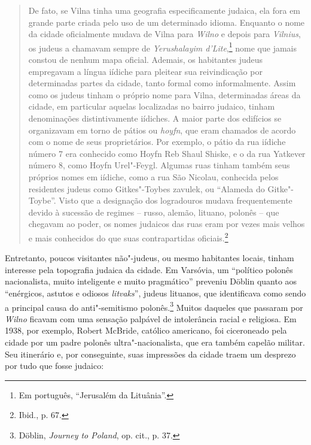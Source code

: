 \begin{quote}
De fato, se Vilna tinha uma geografia especificamente judaica, ela fora
em grande parte criada pelo uso de um determinado idioma. Enquanto o
nome da cidade oficialmente mudava de Vilna para \textit{Wilno} e depois para
\textit{Vilnius}, os judeus a chamavam 
sempre de \textit{Yerushalayim d'Lite},\footnote{Em português, ``Jerusalém da Lituânia''.} 
nome que jamais constou de nenhum mapa
oficial. Ademais, os habitantes judeus empregavam a língua iídiche para
pleitear sua reivindicação por determinadas partes da cidade, tanto
formal como informalmente. Assim como os judeus tinham o próprio nome
para Vilna, determinadas áreas da cidade, em particular aquelas
localizadas no bairro judaico, tinham denominações distintivamente
iídiches. A maior parte dos edifícios se organizavam em torno de pátios
ou \textit{hoyfn}, que eram chamados de acordo com o nome de seus
proprietários. Por exemplo, o pátio da rua iídiche número 7 era
conhecido como Hoyfn Reb Shaul Shiske, e o da rua Yatkever número 8,
como Hoyfn Urel"-Feygl. Algumas ruas tinham também seus próprios nomes em
iídiche, como a rua São Nicolau, conhecida pelos residentes judeus como
Gitkes"-Toybes zavulek, ou ``Alameda do Gitke"-Toybe''. Visto que a
designação dos logradouros mudava frequentemente devido à sucessão de
regimes -- russo, alemão, lituano, polonês -- que chegavam ao poder, os
nomes judaicos das ruas eram por vezes mais velhos e mais conhecidos do
que suas contrapartidas oficiais.\footnote{Ibid., p. 67.}
\end{quote}

Entretanto, poucos visitantes não"-judeus, ou mesmo habitantes locais,
tinham interesse pela topografia judaica da cidade. Em Varsóvia, um
``político polonês nacionalista, muito inteligente e muito pragmático''
preveniu Döblin quanto aos ``enérgicos, astutos e odiosos \textit{litvaks}'', 
judeus lituanos, que identificava como sendo a principal causa do
anti"-semitismo polonês.\footnote{Döblin, \textit{Journey to Poland}, op. cit., p. 37.} Muitos daqueles que passaram por \textit{Wilno} ficavam com uma sensação palpável de intolerância racial e religiosa. Em 1938, por
exemplo, Robert McBride, católico americano, foi ciceroneado pela cidade
por um padre polonês ultra"-nacionalista, que era também capelão militar.
Seu itinerário e, por conseguinte, suas impressões da cidade traem um
desprezo por tudo que fosse judaico:

